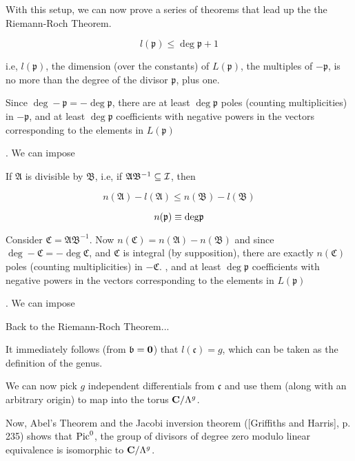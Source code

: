 With this setup, we can now prove a series of theorems that lead up
the the Riemann-Roch Theorem.

\theorem

$$l(\mathfrak{p}) \leq \deg \mathfrak{p} +1$$

i.e, $l(\mathfrak{p})$, the dimension (over the constants) of
$L(\mathfrak{p})$, the multiples of $-\mathfrak{p}$, is no more than
the degree of the divisor $\mathfrak{p}$, plus one.

\proof

Since $\deg -\mathfrak{p} = - \deg \mathfrak{p}$, there are at least
$\deg \mathfrak{p}$ poles (counting multiplicities) in
$-\mathfrak{p}$, and at least $\deg \mathfrak{p}$
coefficients with negative powers in the vectors corresponding
to the elements in $L(\mathfrak{p})$

.  We can impose

\endtheorem

\theorem

If $\mathfrak{A}$ is divisible by $\mathfrak{B}$, i.e, if
$\mathfrak{A}\mathfrak{B}^{-1} \subseteq {\cal I}$, then

$$n(\mathfrak{A}) - l(\mathfrak{A}) \leq n(\mathfrak{B}) - l(\mathfrak{B}) $$

$$n(\mathfrak{p}) \equiv {\rm deg} \mathfrak{p}$$

\proof

Consider $\mathfrak{C} = \mathfrak{A}\mathfrak{B}^{-1}$.
Now $n(\mathfrak{C}) = n(\mathfrak{A}) - n(\mathfrak{B})$ and since
$\deg -\mathfrak{C} = - \deg \mathfrak{C}$, and
$\mathfrak{C}$ is integral (by supposition),
there are exactly
$n(\mathfrak{C})$ poles (counting multiplicities) in $-\mathfrak{C}$.
, and at least $\deg \mathfrak{p}$
coefficients with negative powers in the vectors corresponding
to the elements in $L(\mathfrak{p})$

.  We can impose

\endtheorem

Back to the Riemann-Roch Theorem...

It immediately follows (from $\mathfrak{b}={\bf 0}$) that
$l(\mathfrak{c})=g$, which can be taken as the definition of the
genus.

We can now pick $g$ independent differentials from $\mathfrak{c}$ and
use them (along with an arbitrary origin) to map into the torus
${\bf C}/\Lambda^g$.

Now, Abel's Theorem and the Jacobi inversion theorem ([Griffiths and
Harris], p. 235) shows that ${\rm Pic}^0$, the group of divisors of
degree zero modulo linear equivalence is isomorphic to ${\bf
C}/\Lambda^g$.


